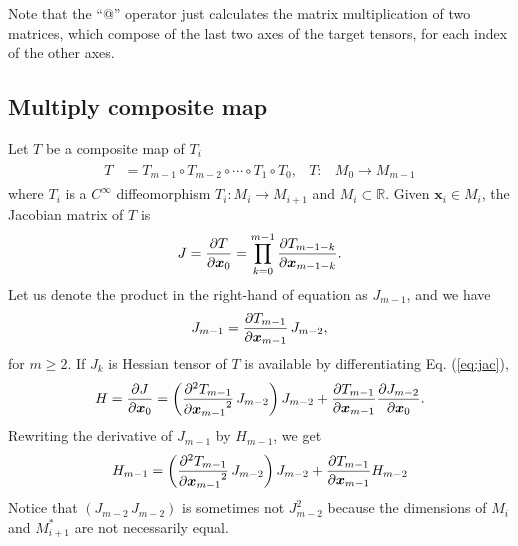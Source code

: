 \documentclass[a4paper]{article}
\newcommand{\R}{\mathbb{R}}
\newcommand{\pderiv}[3][1]{%
    \ifthenelse{\equal{#1}{1}}{\frac{\partial #2}{\partial #3}}{\frac{\partial^#1 #2}{{\partial #3}^#1}}
}
\newcommand{\jac}{J}
\newcommand{\hes}{H}
\newcommand{\parens}[1]{\left(#1\right)}
\begin{document}
\begin{center}
    
\end{center}

Note that the ``@'' operator just calculates the matrix multiplication of two matrices,
which compose of the last two axes of the target tensors, for each index of the other axes.

\subsection{Multiply composite map}
Let $T$ be a composite map of $T_i$
\begin{align}
    \begin{aligned}
        T &= T_{m-1} \circ T_{m-2} \circ \cdots \circ T_1 \circ T_0,
        &
        T: & M_0 \to M_{m-1}
    \end{aligned}
    \end{align}
where $T_i$ is a $C^{\infty}$ diffeomorphism $T_i: M_i \to M_{i+1}$ and $M_i \subset \R$.
Given $\bm x_i \in M_i$, the Jacobian matrix of $T$ is
\begin{align}
    \jac = \pderiv{T}{\bm x_0} = \prod_{k=0}^{m-1} \pderiv{T_{m-1-k}}{\bm x_{m-1-k}}.
\end{align}
Let us denote the product in the right-hand of equation as $\jac_{m-1}$, and we have
\begin{align}
    \jac_{m-1} = \pderiv{T_{m-1}}{\bm x_{m-1}}\, \jac_{m-2},
    \label{eq:jac}
\end{align}
for $m \ge 2$.
If $\jac_{k}$ is
Hessian tensor of $T$ is available by differentiating Eq. (\ref{eq:jac}),
\begin{align}
    \hes = \pderiv{\jac}{\bm x_0}
    =
    \parens{
        \pderiv[2]{T_{m-1}}{\bm x_{m-1}}\,
        \jac_{m-2}
    }
    \jac_{m-2}
    +
    \pderiv{T_{m-1}}{\bm x_{m-1}}
    \pderiv{\jac_{m-2}}{\bm x_0}.
\end{align}
Rewriting the derivative of $\jac_{m-1}$ by $\hes_{m-1}$, we get
\begin{align}
    \hes_{m-1} =
    \parens{
        \pderiv[2]{T_{m-1}}{\bm x_{m-1}}\,
        \jac_{m-2}
    }
    \jac_{m-2}
    +
    \pderiv{T_{m-1}}{\bm x_{m-1}}
    \hes_{m-2}
\end{align}
Notice that $\parens{\jac_{m-2}\, \jac_{m-2}}$ is sometimes not $\jac_{m-2}^2$
because the dimensions of $M_{i}$ and $M_{i+1}^*$
are not necessarily equal.
\clearpage
\end{document}
